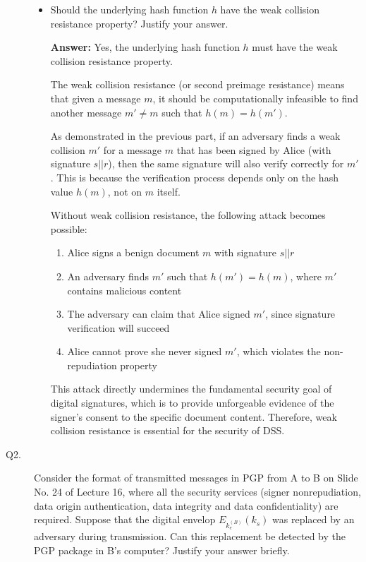 \documentclass[11pt]{article}
\begin{document}
\begin{description}
\begin{itemize}
\item Should the underlying hash function $h$ have the weak collision resistance property?  Justify your answer.  \hfill {}
 


\textbf{Answer:} Yes, the underlying hash function $h$ must have the weak collision resistance property. 

\vspace{0.2cm}
\noindent The weak collision resistance (or second preimage resistance) means that given a message $m$, it should be computationally infeasible to find another message $m' \neq m$ such that $h(m) = h(m')$.

\vspace{0.2cm}
\noindent As demonstrated in the previous part, if an adversary finds a weak collision $m'$ for a message $m$ that has been signed by Alice (with signature $s||r$), then the same signature will also verify correctly for $m'$. This is because the verification process depends only on the hash value $h(m)$, not on $m$ itself.

\vspace{0.2cm}
\noindent Without weak collision resistance, the following attack becomes possible:
\begin{enumerate}
    \item Alice signs a benign document $m$ with signature $s||r$
    \item An adversary finds $m'$ such that $h(m') = h(m)$, where $m'$ contains malicious content
    \item The adversary can claim that Alice signed $m'$, since signature verification will succeed
    \item Alice cannot prove she never signed $m'$, which violates the non-repudiation property
\end{enumerate}

\vspace{0.2cm}
\noindent This attack directly undermines the fundamental security goal of digital signatures, which is to provide unforgeable evidence of the signer's consent to the specific document content. Therefore, weak collision resistance is essential for the security of DSS.


\end{itemize}


\item[Q2.]
Consider the format of transmitted messages in PGP from A to B on Slide No. 24 of Lecture 16, where all the security services (signer nonrepudiation, data origin authentication, data integrity and data confidentiality) are required. 
Suppose that the digital envelop $E_{k_e^{(B)}}(k_s)$ was replaced by an adversary during transmission.  
Can this replacement be detected by the PGP package in B's computer? Justify your answer briefly.  \hfill {}



\end{description}
\end{document}
